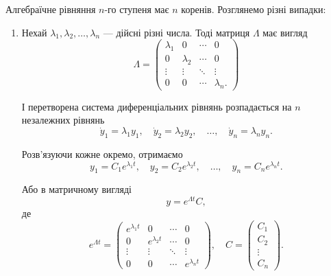 Алгебраїчне рівняння $n$-го ступеня має $n$ коренів. Розглянемо різні випадки:
\begin{enumerate}
\item Нехай $\lambda_1, \lambda_2, \ldots, \lambda_n$ --- дійсні різні числа. Тоді матриця $\Lambda$ має вигляд
\begin{equation*}
	\Lambda = 
	\begin{pmatrix}
		\lambda_1 & 0 & \cdots & 0 \\
		0 & \lambda_2 & \cdots & 0 \\
		\vdots & \vdots & \ddots & \vdots \\
		0 & 0 & \cdots & \lambda_n.
	\end{pmatrix}
\end{equation*}

І перетворена система диференціальних рівнянь розпадається на $n$ незалежних рівнянь
\begin{equation*}
	\dot y_1 = \lambda_1 y_1, \quad \dot y_2 = \lambda_2 y_2, \quad \ldots, \quad \dot y_n = \lambda_n y_n.
\end{equation*}

Розв’язуючи кожне окремо, отримаємо
\begin{equation*}
	y_1 = C_1 e^{\lambda_1 t}, \quad y_2 = C_2 e^{\lambda_2 t}, \quad \ldots, \quad y_n = C_n e^{\lambda_n t}.
\end{equation*}

Або в матричному вигляді
\begin{equation*}
	y = e^{\Lambda t} C,
\end{equation*}
де
\begin{equation*}
	e^{\Lambda t} = 
	\begin{pmatrix}
		e^{\lambda_1 t} & 0 & \cdots & 0 \\
		0 & e^{\lambda_2 t} & \cdots & 0 \\
		\vdots & \vdots & \ddots & \vdots \\
		0 & 0 & \cdots & e^{\lambda_n t}
	\end{pmatrix}, \quad
	C = \begin{pmatrix} C_1 \\ C_2 \\ \vdots \\ C_n \end{pmatrix}.
\end{equation*}


\end{enumerate}
